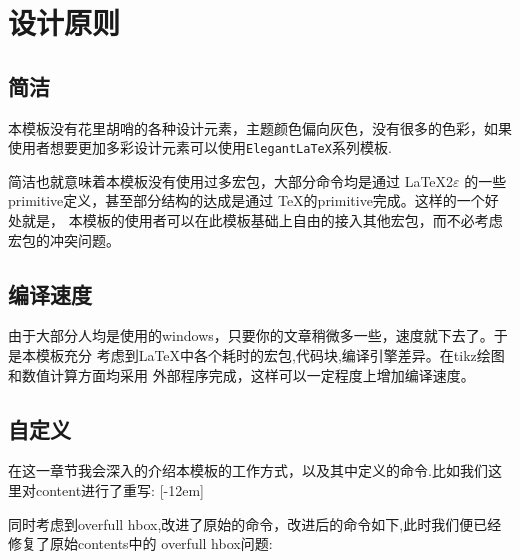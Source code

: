 \section{设计原则}
\subsection{简洁}
本模板没有花里胡哨的各种设计元素，主题颜色偏向灰色，没有很多的色彩，如果
使用者想要更加多彩设计元素可以使用\verb|ElegantLaTeX|系列模板.

简洁也就意味着本模板没有使用过多宏包，大部分命令均是通过 \LaTeX2$\varepsilon{}$ 的一些
primitive定义，甚至部分结构的达成是通过 \TeX{}的primitive完成。这样的一个好处就是，
本模板的使用者可以在此模板基础上自由的接入其他宏包，而不必考虑宏包的冲突问题。


\subsection{编译速度}
由于大部分人均是使用的windows，只要你的文章稍微多一些，速度就下去了。于是本模板充分
考虑到\LaTeX{}中各个耗时的宏包,代码块,编译引擎差异。在tikz绘图和数值计算方面均采用
外部程序完成，这样可以一定程度上增加编译速度。


\subsection{自定义}
在这一章节我会深入的介绍本模板的工作方式，以及其中定义的命令.比如我们这里对content进行了重写:
[-12em]



同时考虑到overfull hbox,改进了原始的命令，改进后的命令如下,此时我们便已经修复了原始contents中的
overfull hbox问题:
\begin{bytes}
\let\old@chapter\chapter
\renewcommand{\chapter}[1]{%
    \ifnum\value{chapter}=1\relax
        \setlength{\title@skip}{-4em}
    \else%
        \setlength{\title@skip}{0em}
    \fi
    \addtocontents{toc}{%
        \protect\mbox{}\protect\hspace*{1.7em}%
            \rule[\the\title@skip]{.03\textwidth}{.006\textheight}%
        \rule[\the\title@skip]{\dimexpr.96\textwidth-2em}{.5pt}\par%
    }
    \old@chapter{#1}
}
\end{bytes}
